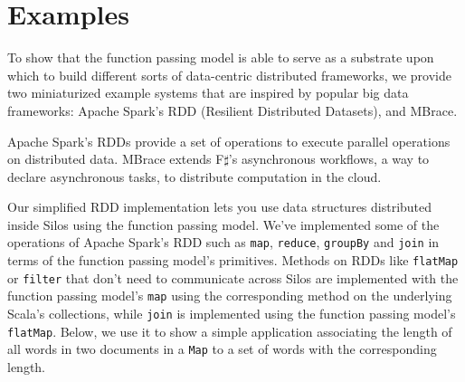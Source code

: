 \documentclass{jfp1}
\begin{document}
%
%

\section{Examples}
\label{sec:examples}

To show that the function passing model is able to serve as a substrate upon
which to build different sorts of data-centric distributed frameworks, we
provide two miniaturized example systems that are inspired by popular big data
frameworks: Apache Spark's RDD (Resilient Distributed Datasets), and MBrace.

Apache Spark's RDDs provide a set of operations to execute parallel operations
on distributed data. MBrace extends F$\sharp$'s asynchronous workflows, a way to
declare asynchronous tasks, to distribute computation in the cloud.

Our simplified RDD implementation lets you use data structures distributed
inside Silos using the function passing model. We've implemented some of the
operations of Apache Spark’s RDD such as \verb|map|, \verb|reduce|,
\verb|groupBy| and \verb|join| in terms of the function passing model's
primitives. Methods on RDDs like \verb|flatMap| or \verb|filter| that don’t need
to communicate across Silos are implemented with the function passing model’s
\verb|map| using the corresponding method on the underlying Scala’s collections,
while \verb|join| is implemented using the function passing model’s
\verb|flatMap|. Below, we use it to show a simple application associating the
length of all words in two documents in a \verb|Map| to a set of words with the
corresponding length.
\end{document}

